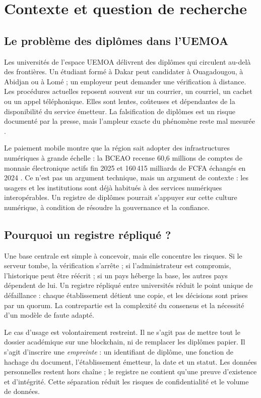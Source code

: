 \documentclass[conference]{IEEEtran}
\begin{document}
\section{Contexte et question de recherche}
\label{sec:contexte}

\subsection{Le problème des diplômes dans l'UEMOA}

Les universités de l'espace UEMOA délivrent des diplômes qui circulent au-delà des frontières. Un étudiant formé à Dakar peut candidater à Ouagadougou, à Abidjan ou à Lomé ; un employeur peut demander une vérification à distance. Les procédures actuelles reposent souvent sur un courrier, un courriel, un cachet ou un appel téléphonique. Elles sont lentes, coûteuses et dépendantes de la disponibilité du service émetteur. La falsification de diplômes est un risque documenté par la presse, mais l'ampleur exacte du phénomène reste mal mesurée \cite{dakaractu2025,ndarinfo2026}.

Le paiement mobile montre que la région sait adopter des infrastructures numériques à grande échelle : la BCEAO recense 60,6 millions de comptes de monnaie électronique actifs fin 2025 et 160\,415 milliards de FCFA échangés en 2024 \cite{bceao2025}. Ce n'est pas un argument technique, mais un argument de contexte : les usagers et les institutions sont déjà habitués à des services numériques interopérables. Un registre de diplômes pourrait s'appuyer sur cette culture numérique, à condition de résoudre la gouvernance et la confiance.

\subsection{Pourquoi un registre répliqué ?}

Une base centrale est simple à concevoir, mais elle concentre les risques. Si le serveur tombe, la vérification s'arrête ; si l'administrateur est compromis, l'historique peut être réécrit ; si un pays héberge la base, les autres pays dépendent de lui. Un registre répliqué entre universités réduit le point unique de défaillance : chaque établissement détient une copie, et les décisions sont prises par un quorum. La contrepartie est la complexité du consensus et la nécessité d'un modèle de faute adapté.

Le cas d'usage est volontairement restreint. Il ne s'agit pas de mettre tout le dossier académique sur une blockchain, ni de remplacer les diplômes papier. Il s'agit d'inscrire une \emph{empreinte} : un identifiant de diplôme, une fonction de hachage du document, l'établissement émetteur, la date et un statut. Les données personnelles restent hors chaîne ; le registre ne contient qu'une preuve d'existence et d'intégrité. Cette séparation réduit les risques de confidentialité et le volume de données.
\end{document}
